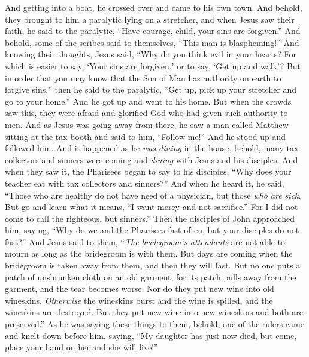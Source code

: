 \begin{biblechapter} %
 And getting into a boat, he crossed over and came to his own town.
\verse And behold, they brought to him a paralytic lying on a stretcher, and when Jesus saw their faith, he said to the paralytic, “Have courage, child, your sins are forgiven.”
\verse And behold, some of the scribes said to themselves, “This man is blaspheming!”
\verse And knowing their thoughts, Jesus said, “Why do you think evil in your hearts?
\verse For which is easier to say, ‘Your sins are forgiven,’ or to say, ‘Get up and walk’?
\verse But in order that you may know that the Son of Man has authority on earth to forgive sins,” then he said to the paralytic, “Get up, pick up your stretcher and go to your home.”
\verse And he got up and went to his home.
\verse But when the crowds saw this, they were afraid and glorified God who had given such authority to men.
 And as Jesus was going away from there, he saw a man called Matthew sitting at the tax booth and said to him, “Follow me!” And he stood up and followed him.
\verse And it happened as he \textit{was dining} in the house, behold, many tax collectors and sinners were coming and \textit{dining} with Jesus and his disciples.
\verse And when they saw it, the Pharisees began to say to his disciples, “Why does your teacher eat with tax collectors and sinners?”
\verse And when he heard it, he said, “Those who are healthy do not have need of a physician, but those \textit{who are sick}.
\verse But go and learn what it means, “I want mercy and not sacrifice.” For I did not come to call the righteous, but sinners.”
 Then the disciples of John approached him, saying, “Why do we and the Pharisees fast often, but your disciples do not fast?”
\verse And Jesus said to them, “\textit{The bridegroom’s attendants} are not able to mourn as long as the bridegroom is with them. But days are coming when the bridegroom is taken away from them, and then they will fast.
\verse But no one puts a patch of unshrunken cloth on an old garment, for its patch pulls away from the garment, and the tear becomes worse.
\verse Nor do they put new wine into old wineskins. \textit{Otherwise} the wineskins burst and the wine is spilled, and the wineskins are destroyed. But they put new wine into new wineskins and both are preserved.”
 As he was saying these things to them, behold, one of the rulers came and knelt down before him, saying, “My daughter has just now died, but come, place your hand on her and she will live!”

\end{biblechapter}
